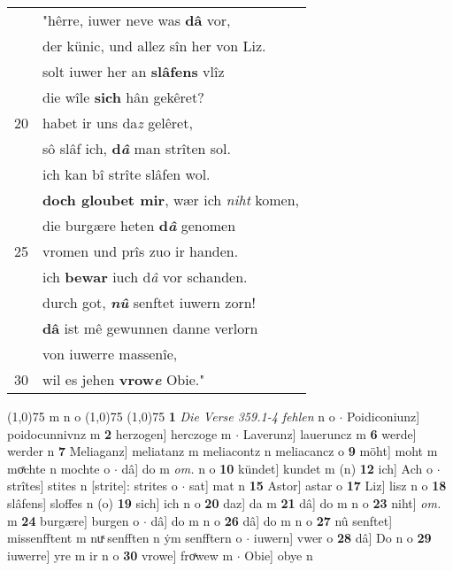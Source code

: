 \documentclass[8pt,a4paper,notitlepage]{article}
\begin{document}
\begin{table}[ht]
\begin{minipage}[t]{0.5\linewidth}
\begin{tabular}{rl}
 & "hêrre, iuwer neve was \textbf{dâ} vor,\\ 
 & der künic, und allez sîn her von Liz.\\ 
 & solt iuwer her an \textbf{slâfens} vlîz\\ 
 & die wîle \textbf{sich} hân gekêret?\\ 
20 & habet ir uns da\textit{z} gelêret,\\ 
 & sô slâf ich, \textbf{d\textit{â}} man strîten sol.\\ 
 & ich kan bî strîte slâfen wol.\\ 
 & \textbf{doch gloubet mir}, wær ich \textit{niht} komen,\\ 
 & die burgære heten \textbf{d\textit{â}} genomen\\ 
25 & vromen und prîs zuo ir handen.\\ 
 & ich \textbf{bewar} iuch d\textit{â} vor schanden.\\ 
 & durch got, \textit{\textbf{nû}} senftet iuwern zorn!\\ 
 & \textbf{dâ} ist mê gewunnen danne verlorn\\ 
 & von iuwerre massenîe,\\ 
30 & wil es jehen \textbf{vrow\textit{e}} Obie."\\ 
\end{tabular}
\scriptsize
\line(1,0){75} \newline
m n o \newline
\line(1,0){75} \newline
\newline
\line(1,0){75} \newline
\textbf{1} \textit{Die Verse 359.1-4 fehlen} n o   $\cdot$ Poidiconiunz] poidocunnivnz m \textbf{2} herzogen] herczoge m  $\cdot$ Laverunz] laueruncz m \textbf{6} werde] werder n \textbf{7} Meliaganz] meliatanz m meliacontz n meliacancz o \textbf{9} möht] moht m moͯchte n mochte o  $\cdot$ dâ] do m \textit{om.} n o \textbf{10} kündet] kundet m (n) \textbf{12} ich] Ach o  $\cdot$ strîtes] stites n [strite]: strites o  $\cdot$ sat] mat n \textbf{15} Astor] astar o \textbf{17} Liz] lisz n o \textbf{18} slâfens] sloffes n (o) \textbf{19} sich] ich n o \textbf{20} daz] da m \textbf{21} dâ] do m n o \textbf{23} niht] \textit{om.} m \textbf{24} burgære] burgen o  $\cdot$ dâ] do m n o \textbf{26} dâ] do m n o \textbf{27} nû senftet] missenfftent m nuͯ senfften n ẏm senfftern o  $\cdot$ iuwern] vwer o \textbf{28} dâ] Do n o \textbf{29} iuwerre] yre m ir n o \textbf{30} vrowe] froͯwew m  $\cdot$ Obie] obye n \newline
\end{minipage}
\end{table}
\end{document}
